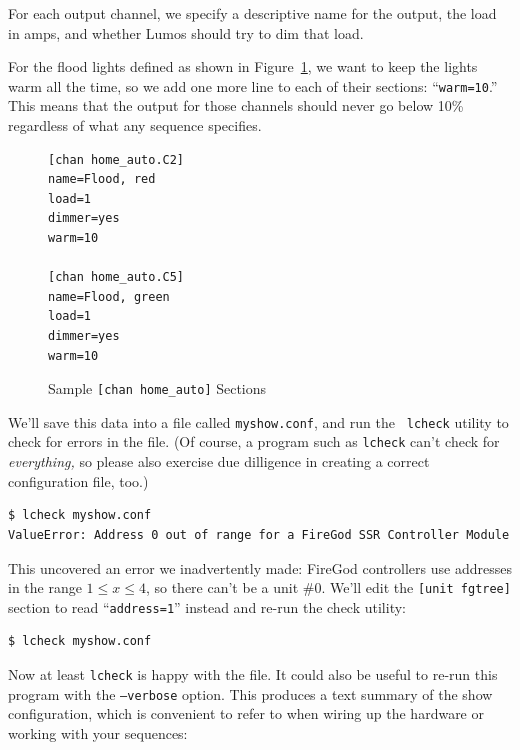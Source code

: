 \documentclass{article}
\begin{document}
For each output channel, we specify a descriptive name for the output, the 
load in amps, and whether Lumos should try to dim that load.

For the flood lights defined as shown in Figure~\ref{conf:homeauto}, we want
to keep the lights warm all the time, so we add one more line to each of their
sections: ``{\tt warm=10}.''  This means that the output for those channels
should never go below 10\% regardless of what any sequence specifies.

\begin{figure}[htbp]
\begin{verbatim}
[chan home_auto.C2]
name=Flood, red
load=1
dimmer=yes
warm=10

[chan home_auto.C5]
name=Flood, green
load=1
dimmer=yes
warm=10
\end{verbatim}
\caption{Sample {\tt[chan home\_auto]} Sections}
\label{conf:homeauto}
\end{figure}

We'll save this data into a file called {\tt myshow.conf}, and run the {\tt
lcheck} utility to check for errors in the file.  (Of course, a program such
as {\tt lcheck} can't check for {\em everything,\/} so please also exercise
due dilligence in creating a correct configuration file, too.)

\begin{verbatim}
$ lcheck myshow.conf
ValueError: Address 0 out of range for a FireGod SSR Controller Module
\end{verbatim}

This uncovered an error we inadvertently made:  FireGod controllers use
addresses in the range $1\le x\le4$, so there can't be a unit \#0.
We'll edit the {\tt[unit~fgtree]} section to read ``{\tt address=1}''
instead and re-run the check utility:

\begin{verbatim}
$ lcheck myshow.conf
\end{verbatim}

Now at least {\tt lcheck} is happy with the file.  It could also be useful to
re-run this program with the {\tt --verbose} option.  This produces a text 
summary of the show configuration, which is convenient to refer to when wiring
up the hardware or working with your sequences:
\end{document}
